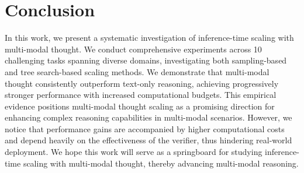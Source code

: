 \section{Conclusion}

In this work, we present a systematic investigation of inference-time scaling with multi-modal thought.
We conduct comprehensive experiments across 10 challenging tasks spanning diverse domains, investigating both sampling-based and tree search-based scaling methods.
We demonstrate that multi-modal thought consistently outperform text-only reasoning, achieving progressively stronger performance with increased computational budgets.
This empirical evidence positions multi-modal thought scaling as a promising direction for enhancing complex reasoning capabilities in multi-modal scenarios.
However, we notice that performance gains are accompanied by higher computational costs and depend heavily on the effectiveness of the verifier, thus hindering real-world deployment.
We hope this work will serve as a springboard for studying inference-time scaling with multi-modal thought, thereby advancing multi-modal reasoning.




